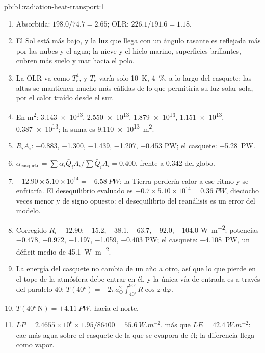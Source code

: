 \begin{solution}{pb:b1:radiation-heat-transport:1}
\begin{enumerate}
        \num{242.9}, \num{241.1} \unit{K}.
  \item Absorbida: $198.0/74.7 = 2.65$; OLR: $226.1/191.6 = 1.18$.
  \item El Sol está más bajo, y la luz que llega con un ángulo rasante es reflejada más por las nubes y el agua; la nieve y el hielo marino, superficies brillantes, cubren más suelo y mar hacia el polo.
  \item La OLR va como $T_e^4$, y $T_e$ varía solo \qty{10}{K}, \qty{4}{\percent},
        a lo largo del casquete: las altas  se mantienen mucho más cálidas de lo que permitiría su luz solar sola, por el calor traído desde el sur.
  \item En \unit{m^2}: \num{3.143e13}, \num{2.550e13}, \num{1.879e13},
        \num{1.151e13}, \num{0.387e13}; la suma es \qty{9.110e13}{m^2}.
  \item $R_iA_i$: \num{-0.883}, \num{-1.300}, \num{-1.439}, \num{-1.207},
        \num{-0.453} \unit{PW}; el casquete: \qty{-5.28}{PW}.
  \item $\alpha_\text{casquete} = \sum\alpha_i\bar Q_iA_i/\sum\bar Q_iA_i = 0.400$,
        frente a \num{0.342} del globo.
  \item $-12.90 \times 5.10\times10^{14} = \qty{-6.58}{PW}$: la Tierra perdería calor a ese ritmo y se enfriaría. El desequilibrio evaluado es
        $+0.7 \times 5.10\times10^{14} = \qty{+0.36}{PW}$, dieciocho veces menor y
        de signo opuesto: el desequilibrio del reanálisis es un error del modelo.
  \item Corregido $R_i + 12.90$: \num{-15.2}, \num{-38.1}, \num{-63.7},
        \num{-92.0}, \num{-104.0} \unit{W.m^{-2}}; potencias \num{-0.478},
        \num{-0.972}, \num{-1.197}, \num{-1.059}, \num{-0.403} \unit{PW}; el casquete:
        \qty{-4.108}{PW}, un déficit medio de \qty{45.1}{W.m^{-2}}.
  \item La energía del casquete no cambia de un año a otro, así que lo que pierde en el tope de la atmósfera debe entrar en él, y la única vía de entrada es a través del paralelo 40: $T(\ang{40}) = -2\pi a_\oplus^2\int_{\ang{40}}^{\ang{90}}
        R\cos\varphi\,\mathrm d\varphi$.
  \item $T(\ang{40}\,\text{N}) = +\qty{4.11}{PW}$, hacia el norte.
  \item $LP = 2.4655\times10^6 \times 1.95/86400 = \qty{55.6}{W.m^{-2}}$, más que
        $LE = \qty{42.4}{W.m^{-2}}$: cae más agua sobre el casquete de la que se evapora de él; la diferencia llega como vapor.

\end{enumerate}
\end{solution}
